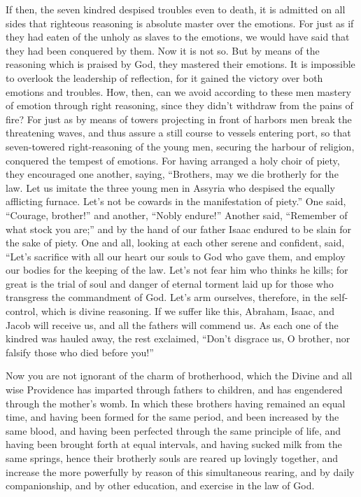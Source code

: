  If then, the seven kindred despised troubles even to
death, it is admitted on all sides that righteous reasoning is absolute
master over the emotions.  For just as if they had eaten
of the unholy as slaves to the emotions, we would have said that they
had been conquered by them.  Now it is not so. But by
means of the reasoning which is praised by God, they mastered their
emotions.  It is impossible to overlook the leadership of
reflection, for it gained the victory over both emotions and troubles.
 How, then, can we avoid according to these men mastery of
emotion through right reasoning, since they didn't withdraw from the
pains of fire?  For just as by means of towers projecting
in front of harbors men break the threatening waves, and thus assure a
still course to vessels entering port,  so that
seven-towered right-reasoning of the young men, securing the harbour of
religion, conquered the tempest of emotions.  For having
arranged a holy choir of piety, they encouraged one another, saying,
 ``Brothers, may we die brotherly for the law. Let us
imitate the three young men in Assyria who despised the equally
afflicting furnace.  Let's not be cowards in the
manifestation of piety.''  One said, ``Courage,
brother!'' and another, ``Nobly endure!''  Another said,
``Remember of what stock you are;'' and by the hand of our father Isaac
endured to be slain for the sake of piety.  One and all,
looking at each other serene and confident, said, ``Let's sacrifice with
all our heart our souls to God who gave them, and employ our bodies for
the keeping of the law.  Let's not fear him who thinks he
kills;  for great is the trial of soul and danger of
eternal torment laid up for those who transgress the commandment of God.
 Let's arm ourselves, therefore, in the self-control,
which is divine reasoning.  If we suffer like this,
Abraham, Isaac, and Jacob will receive us, and all the fathers will
commend us.  As each one of the kindred was hauled away,
the rest exclaimed, ``Don't disgrace us, O brother, nor falsify those
who died before you!''

 Now you are not ignorant of the charm of brotherhood,
which the Divine and all wise Providence has imparted through fathers to
children, and has engendered through the mother's womb. 
In which these brothers having remained an equal time, and having been
formed for the same period, and been increased by the same blood, and
having been perfected through the same principle of life,
 and having been brought forth at equal intervals, and
having sucked milk from the same springs, hence their brotherly souls
are reared up lovingly together,  and increase the more
powerfully by reason of this simultaneous rearing, and by daily
companionship, and by other education, and exercise in the law of God.

